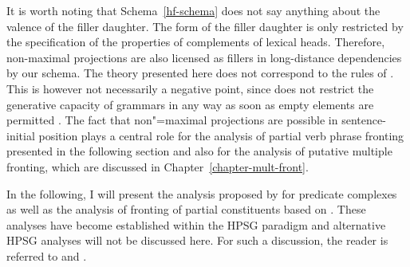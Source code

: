 {{It is worth noting that Schema~\ref{hf-schema} does not say anything about the valence of the filler
daughter. The form of the filler daughter is only restricted by the specification of the properties of complements of lexical 
heads. Therefore, non-maximal projections are also licensed as fillers in long-distance dependencies by our schema. The theory
presented here does not correspond to the rules of \xbart \citep*{Jackendoff77a}. This is however not necessarily a negative
point, since \xbart does not restrict the generative capacity of grammars in any way as soon as
empty elements are permitted \citep{Pullum85a,KP90a}. The fact that non"=maximal projections are possible in sentence-initial position plays a central role
for the analysis of partial verb phrase fronting presented in the following section and also for the analysis of putative
multiple fronting, which are discussed in Chapter~\ref{chapter-mult-front}. 


In the following, I will present the analysis proposed by  for predicate complexes as well as the analysis of fronting of partial
constituents based on . These analyses have become established within the
HPSG paradigm and alternative HPSG analyses will not be discussed here.
For such a discussion, the reader is referred to  and .



%



}}
